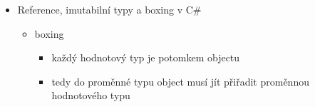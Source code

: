 \begin{itemize}
\begin{itemize}
\begin{itemize}
\item \texttt{public \allowbreak{}T \allowbreak{}this[int \allowbreak{}i] \allowbreak{}\{ \allowbreak{}get \allowbreak{}\{ \allowbreak{}return \allowbreak{}arr[i];\allowbreak{} \allowbreak{}\}\allowbreak{} \allowbreak{}set \allowbreak{}\{ \allowbreak{}arr[i] \allowbreak{}= \allowbreak{}value;\allowbreak{} \allowbreak{}\}\allowbreak{} \allowbreak{}\}\allowbreak{} \allowbreak{}\}\allowbreak{}}
\end{itemize}
\item nullable value types mají vlastnost \texttt{bool \allowbreak{}HasValue} a taky \texttt{T \allowbreak{}Value}
\item přetěžování operátorů
\begin{itemize}
\item \texttt{public \allowbreak{}static \allowbreak{}Fraction \allowbreak{}operator \allowbreak{}*(\allowbreak{}Fraction \allowbreak{}left,\allowbreak{} \allowbreak{}Fraction \allowbreak{}right)\allowbreak{} \allowbreak{}=\textgreater{}\allowbreak{} \allowbreak{}new \allowbreak{}Fraction(\allowbreak{}left.\allowbreak{}numerator \allowbreak{}* \allowbreak{}right.\allowbreak{}numerator,\allowbreak{} \allowbreak{}left.\allowbreak{}denominator \allowbreak{}* \allowbreak{}right.\allowbreak{}denominator)\allowbreak{};\allowbreak{}}
\end{itemize}
\item přetížení konverze
\begin{itemize}
\item \texttt{public \allowbreak{}static \allowbreak{}implicit \allowbreak{}operator \allowbreak{}byte(\allowbreak{}Digit \allowbreak{}d)\allowbreak{} \allowbreak{}=\textgreater{}\allowbreak{} \allowbreak{}d.\allowbreak{}digit;\allowbreak{}}
\item \texttt{public \allowbreak{}static \allowbreak{}explicit \allowbreak{}operator \allowbreak{}Digit(\allowbreak{}byte \allowbreak{}b)\allowbreak{} \allowbreak{}=\textgreater{}\allowbreak{} \allowbreak{}new \allowbreak{}Digit(\allowbreak{}b)\allowbreak{};\allowbreak{}}
\end{itemize}
\end{itemize}
\item Reference, imutabilní typy a boxing v C\#
\begin{itemize}
\item boxing
\begin{itemize}
\item každý hodnotový typ je potomkem objectu
\item tedy do proměnné typu object musí jít přiřadit proměnnou hodnotového typu

\end{itemize}
\end{itemize}
\end{itemize}
